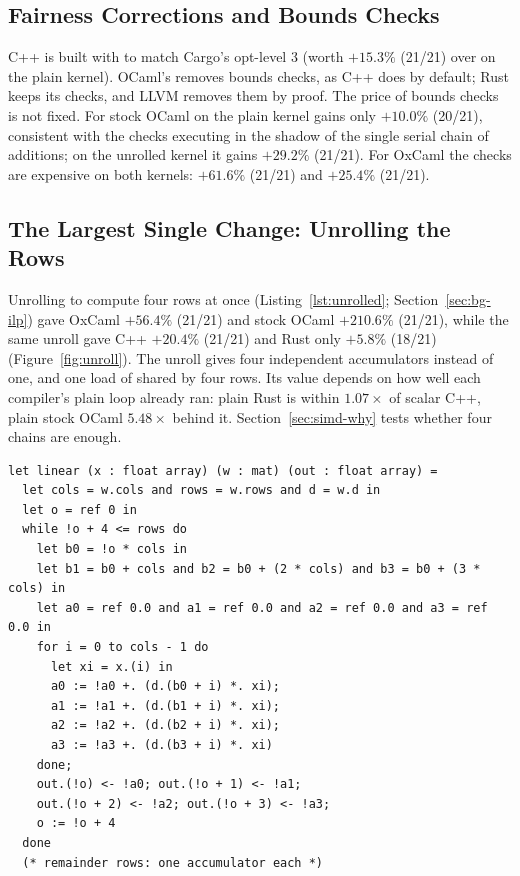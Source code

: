 \subsection{Fairness Corrections and Bounds Checks}
\label{tab:bounds}
C++ is built with  to match Cargo's opt-level 3 (worth
$+15.3\%$ (21/21) over  on the plain kernel). OCaml's
 removes bounds checks, as C++ does by default; Rust keeps its
checks, and LLVM removes them by proof. The price of bounds checks is not
fixed. For stock OCaml on the plain kernel  gains only
$+10.0\%$ (20/21), consistent with the checks executing
in the shadow of the single serial chain of additions; on the unrolled kernel
it gains $+29.2\%$ (21/21). For OxCaml the checks are
expensive on both kernels: $+61.6\%$ (21/21) and
$+25.4\%$ (21/21).

\subsection{The Largest Single Change: Unrolling the Rows}
\label{sec:unroll}
Unrolling  to compute four rows at once
(Listing~\ref{lst:unrolled}; Section~\ref{sec:bg-ilp}) gave OxCaml
$+56.4\%$ (21/21) and stock OCaml
$+210.6\%$ (21/21), while the same unroll gave C++
$+20.4\%$ (21/21) and Rust only $+5.8\%$ (18/21)
(Figure~\ref{fig:unroll}). The unroll gives four independent accumulators
instead of one, and one load of  shared by four rows. Its value
depends on how well each compiler's plain loop already ran: plain Rust is
within $1.07\times$ of scalar C++, plain stock OCaml
$5.48\times$ behind it. Section~\ref{sec:simd-why} tests whether
four chains are enough.

\begin{lstlisting}[language=OCamlX,caption={The shipped OCaml kernel: four rows, four independent accumulators, each row summed left to right (C++ and Rust alike).},label=lst:unrolled]
let linear (x : float array) (w : mat) (out : float array) =
  let cols = w.cols and rows = w.rows and d = w.d in
  let o = ref 0 in
  while !o + 4 <= rows do
    let b0 = !o * cols in
    let b1 = b0 + cols and b2 = b0 + (2 * cols) and b3 = b0 + (3 * cols) in
    let a0 = ref 0.0 and a1 = ref 0.0 and a2 = ref 0.0 and a3 = ref 0.0 in
    for i = 0 to cols - 1 do
      let xi = x.(i) in
      a0 := !a0 +. (d.(b0 + i) *. xi);
      a1 := !a1 +. (d.(b1 + i) *. xi);
      a2 := !a2 +. (d.(b2 + i) *. xi);
      a3 := !a3 +. (d.(b3 + i) *. xi)
    done;
    out.(!o) <- !a0; out.(!o + 1) <- !a1;
    out.(!o + 2) <- !a2; out.(!o + 3) <- !a3;
    o := !o + 4
  done
  (* remainder rows: one accumulator each *)
\end{lstlisting}

